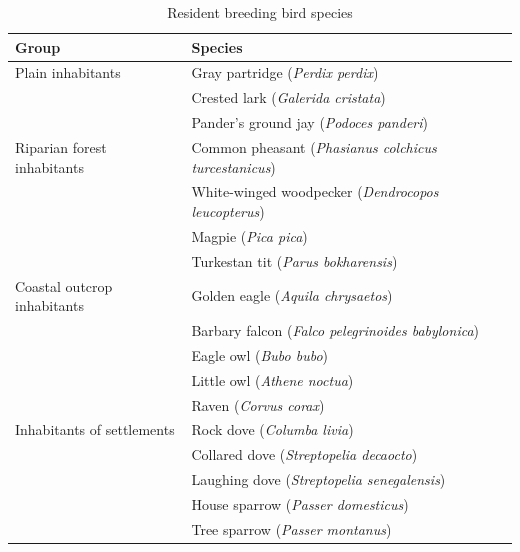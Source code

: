 \begin{table}[h]
\centering
\caption{Resident breeding bird species}
\begin{tabular}{ll}
\hline
\textbf{Group} & \textbf{Species} \\
\hline
Plain inhabitants & Gray partridge (\textit{Perdix perdix}) \\
& Crested lark (\textit{Galerida cristata}) \\
& Pander’s ground jay (\textit{Podoces panderi}) \\
\hline
Riparian forest inhabitants & Common pheasant (\textit{Phasianus colchicus turcestanicus}) \\
& White-winged woodpecker (\textit{Dendrocopos leucopterus}) \\
& Magpie (\textit{Pica pica}) \\
& Turkestan tit (\textit{Parus bokharensis}) \\
\hline
Coastal outcrop inhabitants & Golden eagle (\textit{Aquila chrysaetos}) \\
& Barbary falcon (\textit{Falco pelegrinoides babylonica}) \\
& Eagle owl (\textit{Bubo bubo}) \\
& Little owl (\textit{Athene noctua}) \\
& Raven (\textit{Corvus corax}) \\
\hline
Inhabitants of settlements & Rock dove (\textit{Columba livia}) \\
& Collared dove (\textit{Streptopelia decaocto}) \\
& Laughing dove (\textit{Streptopelia senegalensis}) \\
& House sparrow (\textit{Passer domesticus}) \\
& Tree sparrow (\textit{Passer montanus}) \\
\hline
\end{tabular}
\end{table}

